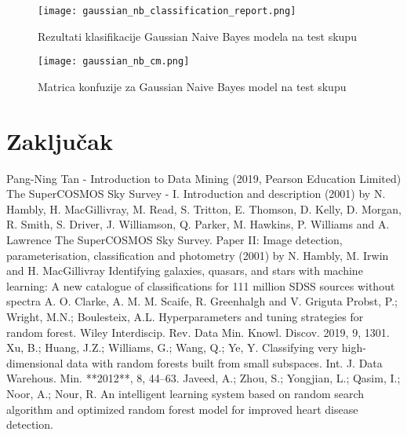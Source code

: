 \documentclass[a4paper,12pt]{article}
\begin{document}
\begin{figure}[H]
\centering
\texttt{[image: gaussian\_nb\_classification\_report.png]}
\caption{Rezultati klasifikacije Gaussian Naive Bayes modela na test skupu}
\label{fig:gaussian_nb_classification_report}
\end{figure}

\begin{figure}[H]
\centering
\texttt{[image: gaussian\_nb\_cm.png]}
\caption{Matrica konfuzije za Gaussian Naive Bayes model na test skupu}
\label{fig:gaussian_nb_cm}
\end{figure}

\section{Zaključak}


\begin{thebibliography}{Literatura}
\bibitem{} Pang-Ning Tan - Introduction to Data Mining (2019, Pearson Education Limited)
\bibitem{} The SuperCOSMOS Sky Survey - I. Introduction and description (2001) by N. Hambly, H. MacGillivray, M. Read, S. Tritton, E. Thomson, D. Kelly, D. Morgan, R. Smith, S. Driver, J. Williamson, Q. Parker, M. Hawkins, P. Williams and A. Lawrence
\bibitem{} The SuperCOSMOS Sky Survey. Paper II: Image detection, parameterisation, classification and photometry (2001) by N. Hambly, M. Irwin and H. MacGillivray
\bibitem{} Identifying galaxies, quasars, and stars with machine learning: A new catalogue of classifications for 111 million SDSS sources without spectra A. O. Clarke, A. M. M. Scaife, R. Greenhalgh and V. Griguta
\bibitem{} Probst, P.; Wright, M.N.; Boulesteix, A.L. Hyperparameters and tuning strategies for random forest. Wiley Interdiscip. Rev. Data Min. Knowl. Discov. 2019, 9, 1301.
\bibitem{} Xu, B.; Huang, J.Z.; Williams, G.; Wang, Q.; Ye, Y. Classifying very high-dimensional data with random forests built from small subspaces. Int. J. Data Warehous. Min. **2012**, 8, 44–63.
\bibitem{} Javeed, A.; Zhou, S.; Yongjian, L.; Qasim, I.; Noor, A.; Nour, R. An intelligent learning system based on random search algorithm and optimized random forest model for improved heart disease detection.
\end{thebibliography}
\end{document}
